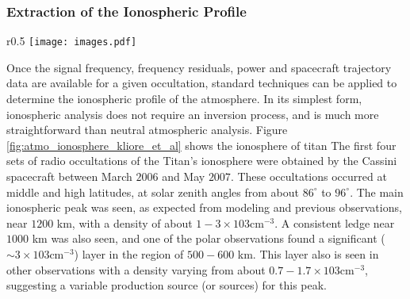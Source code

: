 \documentclass{article}
\begin{document}
            \subsubsection{\footnotesize Extraction of the Ionospheric Profile}
            \begin{wrapfigure}[22]{r}{0.5\textwidth}
            	\centering
                \vspace{-5ex}
            	\texttt{[image: images.pdf]}
            	\caption[Observed Electron Density Profile of Titan]{Observed electron density profiles for dawn and dusk. Voyager $1$ is also shown for comparison.}
            	\label{fig:atmo_ionosphere_kliore_et_al}
            \end{wrapfigure}
            Once the signal frequency, frequency residuals, power and spacecraft trajectory data are available for a given occultation, standard techniques can be applied to determine the ionospheric profile of the atmosphere. In its simplest form, ionospheric analysis does not require an inversion process, and is much more straightforward than neutral atmospheric analysis. Figure \ref{fig:atmo_ionosphere_kliore_et_al} shows the ionosphere of \gls{titan} The first four sets of radio occultations of the Titan's ionosphere were obtained by the Cassini spacecraft between March $2006$ and May $2007$. These occultations occurred at middle and high latitudes, at solar zenith angles from about $86^{\circ}$ to $96^{\circ}$. The main ionospheric peak was seen, as expected from modeling and previous observations, near $1200$ km, with a density of about $1-3 \times 103 \textrm{cm}^{-3}$. A consistent ledge near $1000$ km was also seen, and one of the polar observations found a significant ($\sim 3 \times 103 \textrm{cm}^{-3}$) layer in the region of $500-600$ km. This layer also is seen in other observations with a density varying from about $0.7 - 1.7 \times 103 \textrm{cm}^{-3}$, suggesting a variable production source (or sources) for this peak.
\end{document}

